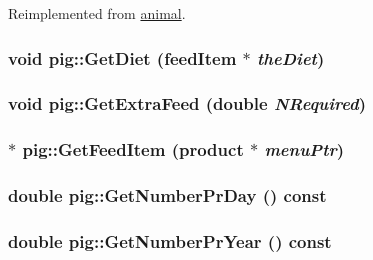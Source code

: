 Reimplemented from \hyperlink{classanimal_aef7118b0c94cb1bc05aa8783d80e10f0}{animal}.\hypertarget{classpig_a8838d76bf26c0517ef1c79c0ff3c8988}{
\subsubsection[{GetDiet}]{\setlength{\rightskip}{0pt plus 5cm}void pig::GetDiet ({\bf feedItem} $\ast$ {\em theDiet})}}
\label{classpig_a8838d76bf26c0517ef1c79c0ff3c8988}
\hypertarget{classpig_a08c3cb7e3cbffe06466eade9e044157e}{
\subsubsection[{GetExtraFeed}]{\setlength{\rightskip}{0pt plus 5cm}void pig::GetExtraFeed (double {\em NRequired})}}
\label{classpig_a08c3cb7e3cbffe06466eade9e044157e}
\hypertarget{classpig_aafe346132ff6ab66abcb11400b41eac4}{
\subsubsection[{GetFeedItem}]{ $\ast$ pig::GetFeedItem ({\bf product} $\ast$ {\em menuPtr})}}
\label{classpig_aafe346132ff6ab66abcb11400b41eac4}
\hypertarget{classpig_a907a151f7a0f59dd2c9b02da72ae43e9}{
\subsubsection[{GetNumberPrDay}]{\setlength{\rightskip}{0pt plus 5cm}double pig::GetNumberPrDay () const}}
\label{classpig_a907a151f7a0f59dd2c9b02da72ae43e9}
\hypertarget{classpig_a39f938b4e819af79b288eadaf19e9f35}{
\subsubsection[{GetNumberPrYear}]{\setlength{\rightskip}{0pt plus 5cm}double pig::GetNumberPrYear () const}}
